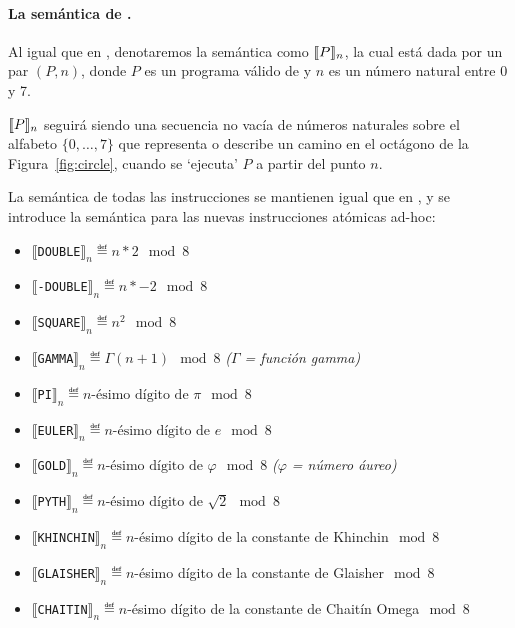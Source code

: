 \paragraph{La semántica de \gramgeoprima.}

Al igual que en \gramgeo, denotaremos la semántica como $\llbracket P\rrbracket_n$, la cual está dada por un par $(P,n)$, donde $P$ es un programa válido de \gramgeoprima y $n$ es un número natural entre 0 y 7.

$\llbracket P\rrbracket_n$ seguirá siendo una secuencia no vacía de números naturales sobre el alfabeto $\{0,\dots,7\}$ que representa o describe un camino en el octágono de la Figura~\ref{fig:circle}, cuando se `ejecuta' $P$ a partir del punto $n$. 

La semántica de todas las instrucciones se mantienen igual que en \gramgeo, y se introduce la semántica para las nuevas instrucciones atómicas ad-hoc:

\begin{itemize}
\item $\llbracket$\verb#DOUBLE#$\rrbracket_n  \eqdef  n * 2 \mod 8$ 
\item $\llbracket$\verb#-DOUBLE#$\rrbracket_n  \eqdef  n * -2 \mod 8$  
\item $\llbracket$\verb#SQUARE#$\rrbracket_n  \eqdef  n^2 \mod 8$  
\item $\llbracket$\verb#GAMMA#$\rrbracket_n  \eqdef  \Gamma(n+1) \mod 8$  \textit{($\Gamma$ = función gamma)}
\item $\llbracket$\verb#PI#$\rrbracket_n  \eqdef  n\text{-ésimo dígito de } \pi \mod 8$  

\item $\llbracket$\verb#EULER#$\rrbracket_n  \eqdef  n\text{-ésimo dígito de } e \mod 8$  
\item $\llbracket$\verb#GOLD#$\rrbracket_n  \eqdef  n\text{-ésimo dígito de } \varphi \mod 8$  \textit{($\varphi$ = número áureo)}
\item $\llbracket$\verb#PYTH#$\rrbracket_n  \eqdef n\text{-ésimo dígito de } \sqrt{2} \mod 8$
\item $\llbracket$\verb#KHINCHIN#$\rrbracket_n  \eqdef  n$-ésimo dígito de la constante de Khinchin$ \mod 8$  
\item $\llbracket$\verb#GLAISHER#$\rrbracket_n  \eqdef  n$-ésimo dígito de la constante de Glaisher$ \mod 8$  
\item $\llbracket$\verb#CHAITIN#$\rrbracket_n  \eqdef
 n $-ésimo dígito de la constante de Chaitín Omega$ \mod 8$  
\end{itemize}

